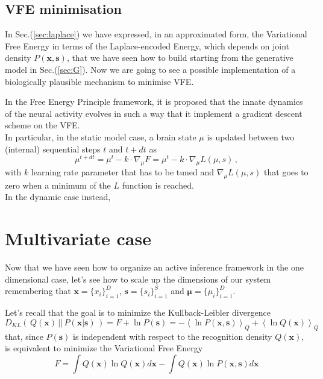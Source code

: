 \documentclass[a4paper, 10pt]{article}
\begin{document}
\subsection{VFE minimisation}
In Sec.(\ref{sec:laplace}) we have expressed, in an approximated form, the Variational Free Energy in terms of the Laplace-encoded Energy, which depends on joint density $P(\mathbf x, \mathbf s)$, that we have seen how to build starting from the generative model in Sec.(\ref{sec:G}). Now we are going to see a possible implementation of a biologically plausible mechanism to minimise VFE.

In the Free Energy Principle framework, it is proposed that the innate dynamics of the neural activity evolves in such a way that it implement a gradient descent scheme on the VFE. \\
In particular, in the static model case, a brain state $\mu$ is updated between two (internal) sequential steps $t$ and $t+dt$ as
\begin{equation}
\mu^{t+dt} = \mu^{t} - k \cdot \nabla_{\mu} F = \mu^{t} - k \cdot \nabla_{\mu} L(\mu, s) \, ,
\end{equation}
with $k$ learning rate parameter that has to be tuned and $\nabla_{\mu} L(\mu, s)$ that goes to zero when a minimum of the $L$ function is reached.\\
In the dynamic case instead,  





\newpage
\section{Multivariate case}
Now that we have seen how to organize an active inference framework in the one dimensional case, let's see how to scale up the dimensions of our system remembering that $\mathbf x = \lbrace x_i \rbrace_{i=1}^D$, $\mathbf s = \lbrace s_i \rbrace_{i=1}^S$ and $\bm \mu = \lbrace \mu_i \rbrace_{i=1}^D$.

Let's recall that the goal is to minimize the Kullback-Leibler  divergence
\begin{equation}
D_{KL} (\, Q(\mathbf x)\, ||\, P(\mathbf x|\mathbf s)\, )  =  F + \ln P(\mathbf s) = - \left< \ln P(\mathbf x,\mathbf s) \right>_{Q} + \left< \ln Q(\mathbf x) \right>_{Q} 
\end{equation}
that, since $P(\mathbf s)$ is independent with respect to the recognition density $Q(\mathbf x)$, is equivalent to minimize the Variational Free Energy
\begin{equation}
F = \int Q(\mathbf x) \ln Q(\mathbf x) d\mathbf x - \int Q(\mathbf x) \ln P(\mathbf x,\mathbf s) d\mathbf x
\end{equation}
\end{document}
